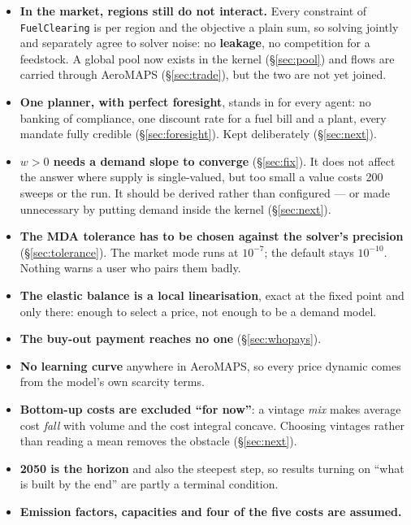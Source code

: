\documentclass[11pt,a4paper]{article}
\newcommand{\var}[1]{\texttt{\small #1}}
\begin{document}
\begin{itemize}[leftmargin=*,nosep]
  \item \textbf{In the market, regions still do not interact.} Every constraint of
        \var{FuelClearing} is per region and the objective a plain sum, so solving jointly
        and separately agree to solver noise: no \textbf{leakage}, no competition for a
        feedstock. A global pool now exists in the kernel (\S\ref{sec:pool}) and flows are
        carried through AeroMAPS (\S\ref{sec:trade}), but the two are not yet joined.
  \item \textbf{One planner, with perfect foresight}, stands in for every agent: no banking
        of compliance, one discount rate for a fuel bill and a plant, every mandate fully
        credible (\S\ref{sec:foresight}). Kept deliberately (\S\ref{sec:next}).
  \item \textbf{$w>0$ needs a demand slope to converge} (\S\ref{sec:fix}). It does not
        affect the answer where supply is single-valued, but too small a value costs 200
        sweeps or the run. It should be derived rather than configured --- or made
        unnecessary by putting demand inside the kernel (\S\ref{sec:next}).
  \item \textbf{The MDA tolerance has to be chosen against the solver's precision}
        (\S\ref{sec:tolerance}). The market mode runs at $10^{-7}$; the default stays
        $10^{-10}$. Nothing warns a user who pairs them badly.
  \item \textbf{The elastic balance is a local linearisation}, exact at the fixed point and
        only there: enough to select a price, not enough to be a demand model.
  \item \textbf{The buy-out payment reaches no one} (\S\ref{sec:whopays}).
  \item \textbf{No learning curve} anywhere in AeroMAPS, so every price dynamic comes from
        the model's own scarcity terms.
  \item \textbf{Bottom-up costs are excluded ``for now''}: a vintage \emph{mix} makes average
        cost \emph{fall} with volume and the cost integral concave. Choosing vintages
        rather than reading a mean removes the obstacle (\S\ref{sec:next}).
  \item \textbf{2050 is the horizon} and also the steepest step, so results turning on
        ``what is built by the end'' are partly a terminal condition.
  \item \textbf{Emission factors, capacities and four of the five costs are assumed.}
\end{itemize}
\end{document}
